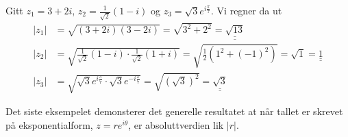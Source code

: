 \documentclass[a4paper,norsk,12pt]{article}
\newcommand{\ans}[1]{\underline{\underline{#1}}}
\newcounter{exa}
\begin{document}
\begin{texample}
Gitt $z_1 = 3 + 2i$, $z_2 = \frac{1}{\sqrt{2}}(1-i)$ og $z_3 = \sqrt{3}e^{i\frac{\pi}{7}}$. Vi regner da ut
\begin{align*}
	|z_1| &= \sqrt{(3+2i)(3-2i)} = \sqrt{3^2 + 2^2} = \ans{\sqrt{13}}\\[12pt]
	|z_2| &= \sqrt{\frac{1}{\sqrt{2}}(1-i)\cdot\frac{1}{\sqrt{2}}(1+i)} = \sqrt{\frac12 \left(1^2 + (-1)^2\right)} = \sqrt{1} = \ans{1}\\[12pt]
	|z_3| &= \sqrt{\sqrt{3}e^{i\frac{\pi}{7}}\cdot\sqrt{3}e^{-i\frac{\pi}{7}}} = \sqrt{(\sqrt{3})^2} = \ans{\sqrt{3}}
\end{align*}
\end{texample}
\noindent
Det siste eksempelet demonsterer det generelle resultatet at når tallet er skrevet på eksponentialform, $z=re^{i\theta}$, er absoluttverdien lik $|r|$.
\end{document}
